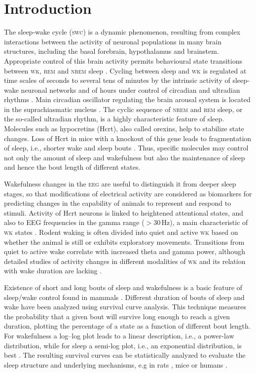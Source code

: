 \documentclass[10pt,letterpaper]{article}
\def\EEG/{\textsc{eeg}}
\def\REM/{\textsc{rem}}
\def\NREM/{\textsc{nrem}}
\def\WK/{\textsc{wk}}
\def\SWC/{\textsc{swc}}
\def\EEG/{\textsc{eeg}}
\begin{document}
\section{Introduction}
The sleep-wake cycle (\SWC/)  is a dynamic phenomenon, resulting from complex interactions between the activity of neuronal populations in many brain structures, including the basal forebrain, hypothalamus and brainstem. Appropriate control of this brain activity permits behavioural state transitions between \WK/, \REM/ and \NREM/ sleep   \cite{Scammell2017,Ferri2016}. Cycling between sleep and \WK/ is regulated at time scales of seconds to several tens of minutes by the intrinsic activity of sleep-wake neuronal networks and of hours under control of circadian and ultradian rhythms \cite{Borbely1982,Phillips2007}. Main circadian oscillator regulating the brain arousal system is located in the suprachiasmatic nucleus \cite{Aston-Jones2001,fleshner2011circadian}. The cyclic sequence of \NREM/ and \REM/ sleep, or the so-called ultradian rhythm, is a highly characteristic feature of sleep.  Molecules such as hypocretins (Hcrt), also called orexins,  help to stabilize state changes. Loss of Hcrt in mice with a knockout of this gene leads to fragmentation of sleep, i.e., shorter wake and sleep bouts \cite{chemelli1999narcolepsy}. Thus, specific molecules may control not only the amount of sleep and wakefulness but also the maintenance of sleep and hence the bout length of different states.

Wakefulness changes in the \EEG/ are useful  to distinguish it from deeper sleep stages, so that modifications of electrical activity are considered as  biomarkers for predicting changes in the capability of animals to represent and respond to stimuli. Activity of Hcrt neurons is linked to heightened attentional states\cite{sasaki2011pharmacogenetic},  and also to EEG frequencies in the gamma range ($>30$\,Hz), a main characteristic of \WK/ states \cite{Lee2005,alexandre2013control,mcginley2015waking}.   Rodent waking is often divided into quiet and active \WK/ based on whether the animal is still or exhibits exploratory movements. Transitions from quiet to active wake correlate with increased theta and gamma power,  although detailed studies of activity changes in different modalities of \WK/ and its relation with wake duration are lacking \cite{vassalli2017hypocretin}. 
 

 Existence of short and long bouts of sleep and wakefulness is a  basic feature of sleep/wake control  found in mammals  \cite{Lo2004}.  Different duration of bouts of sleep and wake have been analyzed using survival curve analysis.  This technique measures the probability that a given bout will survive long enough to reach a given duration, plotting the percentage of a state as a function of different bout length. For wakefulness a log–log plot leads to a linear description, i.e., a power-law distribution, while for sleep a semi-log plot, i.e., an exponential distribution, is best \cite{Lo2004,Behn2007,behn2008delayed,Simasko2009,McShane2010}. The resulting survival curves can be statistically analyzed to evaluate the sleep structure and underlying mechanisms, e.g in rats \cite{stephenson2013statistical}, mice \cite{McShane2010} or humans \cite{klerman2013survival}.
\end{document}
